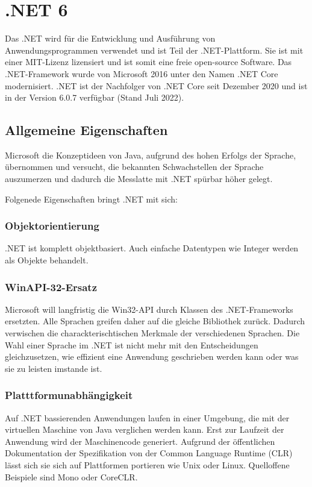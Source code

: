 \section{.NET 6}
Das .NET wird für die Entwicklung und Ausführung von Anwendungsprogrammen verwendet und ist Teil der .NET-Plattform.
Sie ist mit einer MIT-Lizenz lizensiert und ist somit eine freie open-source Software. Das .NET-Framework wurde von Microsoft 
2016 unter den Namen .NET Core modernisiert. .NET ist der Nachfolger von .NET Core seit Dezember 2020 und ist in der Version 6.0.7 verfügbar (Stand Juli 2022).

\subsection{Allgemeine Eigenschaften}
Microsoft die Konzeptideen von Java, aufgrund des hohen Erfolgs der Sprache,
übernommen und versucht, die bekannten Schwachstellen der Sprache auszumerzen und dadurch die Messlatte mit 
.NET spürbar höher gelegt.

Folgenede Eigenschaften bringt .NET mit sich:

\subsubsection{Objektorientierung}
.NET ist komplett objektbasiert. Auch einfache Datentypen wie Integer werden als Objekte behandelt.

\subsubsection{WinAPI-32-Ersatz}
Microsoft will langfristig die Win32-API durch Klassen des .NET-Frameworks ersetzten. Alle Sprachen greifen 
daher auf die gleiche Bibliothek zurück. Dadurch verwischen die charackterischtischen Merkmale der verschiedenen Sprachen. 
Die Wahl einer Sprache im .NET ist nicht mehr mit den Entscheidungen gleichzusetzen, wie effizient eine Anwendung geschrieben werden kann 
oder was sie zu leisten imstande ist.

\subsubsection{Platttformunabhängigkeit}
Auf .NET bassierenden Anwendungen laufen in einer Umgebung, die mit der virtuellen Maschine von Java verglichen werden kann.
Erst zur Laufzeit der Anwendung wird der Maschinencode generiert. Aufgrund der öffentlichen Dokumentation der Spezifikation von 
der Common Language Runtime (CLR) lässt sich sie sich auf Plattformen portieren wie Unix oder Linux. 
Quelloffene Beispiele sind Mono oder CoreCLR.

